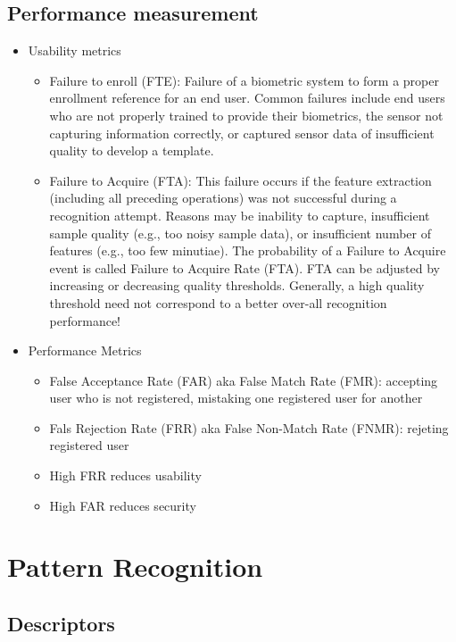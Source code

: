 \documentclass[paper=a4, fontsize=11pt]{scrartcl} %
\numberwithin{equation}{section} %
\numberwithin{figure}{section} %
\numberwithin{table}{section} %
\begin{document}
\subsection{Performance measurement}

\begin{itemize}
\item Usability metrics
\begin{itemize}
\item Failure to enroll (FTE): Failure of a biometric system to form a proper enrollment reference for an end user. Common failures include end users who are not properly trained to provide their biometrics, the sensor not capturing information correctly, or captured sensor data of insufficient quality to develop a template.
\item Failure to Acquire (FTA): This failure occurs if the feature extraction (including all preceding operations) was not successful during a recognition attempt. Reasons may be inability to capture, insufficient sample quality (e.g., too noisy sample data), or insufficient number of features (e.g., too few minutiae). The probability of a Failure to Acquire event is called Failure to Acquire Rate (FTA). FTA can be adjusted by increasing or decreasing quality thresholds. Generally, a high quality threshold need not correspond to a better over-all recognition performance!
\end{itemize}
\item Performance Metrics
\begin{itemize}
\item False Acceptance Rate (FAR) aka False Match Rate (FMR): accepting user who is not registered, mistaking one registered user for another
\item Fals Rejection Rate (FRR) aka False Non-Match Rate (FNMR): rejeting registered user
\item High FRR reduces usability
\item High FAR reduces security
\end{itemize}
\end{itemize}

\section{Pattern Recognition}

\subsection{Descriptors}
\end{document}
